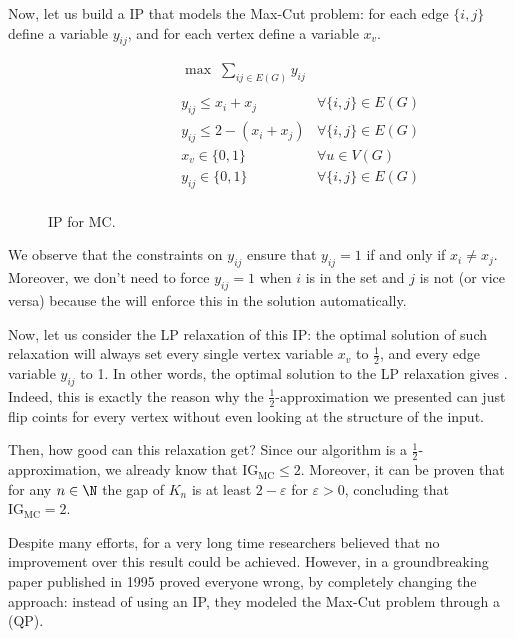 \documentclass[a4paper, 12pt]{report}
\begin{document}
    Now, let us build a IP that models the Max-Cut problem: for each edge $\{i, j\}$ define a variable $y_{ij}$, and for each vertex define a variable $x_v$.

    \begin{figure}[H]
        \centering
        \[\begin{array}{ccl}
            \qquad\qquad\quad
            & \max \; \displaystyle \sum_{ij \in E(G)}{y_{ij}} \\\\
            & y_{ij} \le x_i + x_j & \forall \{i, j\} \in E(G) \\
            & y_{ij} \le 2 - (x_i + x_j) & \forall \{i, j\} \in E(G) \\
            & x_v \in \{0,1\} & \forall u \in V(G) \\
            & y_{ij} \in \{0,1\} & \forall \{i, j\} \in E(G) \\
        \end{array}\]
        \caption{IP for MC.}
    \end{figure}

    We observe that the constraints on $y_{ij}$ ensure that $y_{ij} = 1$ if and only if $x_i \neq x_j$. Moreover, we don't need to force $y_{ij} = 1$ when $i$ is in the set and $j$ is not (or vice versa) because the  will enforce this in the solution automatically.

    Now, let us consider the LP relaxation of this IP: the optimal solution of such relaxation will always set every single vertex variable $x_v$ to $\tfrac{1}{2}$, and every edge variable $y_{ij}$ to 1. In other words, the optimal solution to the LP relaxation gives . Indeed, this is exactly the reason why the $\tfrac{1}{2}$-approximation we presented can just flip coints for every vertex without even looking at the structure of the input.

    Then, how good can this relaxation get? Since our algorithm is a $\tfrac{1}{2}$-approximation, we already know that $\mbox{IG}_\mathrm{MC} \le 2$. Moreover, it can be proven that for any $n \in \N$ the gap of $K_n$ is at least $2 - \varepsilon$ for $\varepsilon > 0$, concluding that $\mbox{IG}_{\mathrm{MC}} = 2$.

    Despite many efforts, for a very long time researchers believed that no improvement over this result could be achieved. However, in a groundbreaking paper published in 1995 \textcite{goemans} proved everyone wrong, by completely changing the approach: instead of using an IP, they modeled the Max-Cut problem through a  (QP).
\end{document}
